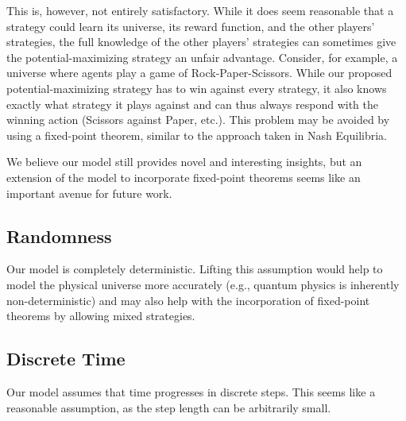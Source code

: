 This is, however, not entirely satisfactory. While it does seem reasonable that
a strategy could learn its universe, its reward function, and the other players'
strategies, the full knowledge of the other players' strategies can sometimes
give the potential-maximizing strategy an unfair advantage. Consider, for
example, a universe where agents play a game of Rock-Paper-Scissors. While
our proposed potential-maximizing strategy has to win against every strategy, it
also knows exactly what strategy it plays against and can thus always respond
with the winning action (Scissors against Paper, etc.). This problem may be
avoided by using a fixed-point theorem, similar to the approach taken in Nash
Equilibria.

We believe our model still provides novel and interesting insights, but an
extension of the model to incorporate fixed-point theorems seems like an
important avenue for future work.

\subsection{Randomness}

Our model is completely deterministic. Lifting this assumption would help to
model the physical universe more accurately (e.g., quantum physics is inherently
non-deterministic) and may also help with the incorporation of fixed-point theorems by
allowing mixed strategies.

\subsection{Discrete Time}

Our model assumes that time progresses in discrete steps. This seems like a
reasonable assumption, as the step length can be arbitrarily small.


